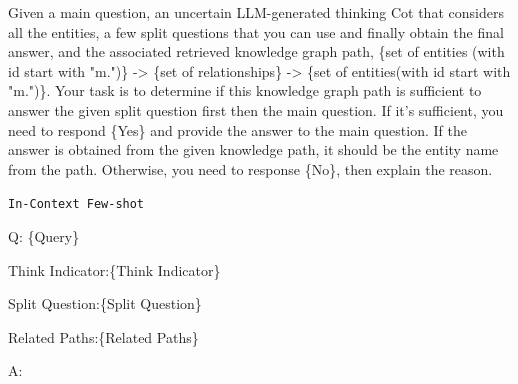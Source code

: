 \begin{center}
    
\begin{minipage}{0.7\columnwidth}
    \vspace{2mm}
    
    \begin{tcolorbox}[title= Question Answering Evaluation Prompt Template]
        \small
Given a main question, an uncertain LLM-generated thinking Cot that considers all the entities, a few split questions that you can use and finally obtain the final answer, and the associated retrieved knowledge graph path, \{set of entities (with id start with "m.")\} -> \{set of relationships\} -> \{set of entities(with id start with "m.")\}.
Your task is to determine if this knowledge graph path is sufficient to answer the given split question first then the main question. 
If it's sufficient, you need to respond \{Yes\} and provide the answer to the main question. If the answer is obtained from the given knowledge path, it should be the entity name from the path. Otherwise, you need to response \{No\}, then explain the reason. 


\vspace{5pt}
    
\texttt{In-Context Few-shot}

\vspace{5pt}
Q: \{Query\} 

Think Indicator:\{Think Indicator\}

Split Question:\{Split Question\}

Related Paths:\{Related Paths\}

A: 
    \end{tcolorbox}
    \vspace{2mm}
\end{minipage}
\end{center}

